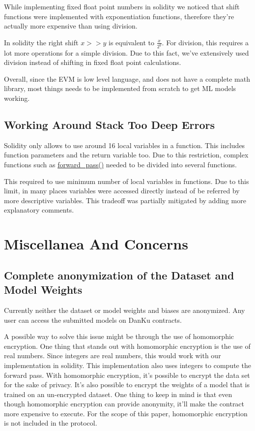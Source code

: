 \documentclass{article}
\begin{document}
While implementing fixed float point numbers in solidity we noticed that shift functions were implemented with exponentiation functions, therefore they’re actually more expensive than using division.

In solidity the right shift $x>>y$ is equivalent to $\frac{x}{2^y}$. For division, this requires a lot more operations for a simple division. Due to this fact, we’ve extensively used division instead of shifting in fixed float point calculations.

Overall, since the EVM is low level language, and does not have a complete math library, most things needs to be implemented from scratch to get ML models working.

\subsection{Working Around Stack Too Deep Errors}

Solidity only allows to use around 16 local variables in a function. This includes function parameters and the return variable too. Due to this restriction, complex functions such as \underline{forward\_pass()} needed to be divided into several functions.

This required to use minimum number of local variables in functions. Due to this limit, in many places variables were accessed directly instead of be referred by more descriptive variables. This tradeoff was partially mitigated by adding more explanatory comments.

\section{Miscellanea And Concerns}
\label{miscellanea_and_concerns}

\subsection{Complete anonymization of the Dataset and Model Weights}

Currently neither the dataset or model weights and biases are anonymized. Any user can access the submitted models on DanKu contracts.

A possible way to solve this issue might be through the use of homomorphic encryption. \cite{ML_encrypted_data_paper} One thing that stands out with homomorphic encryption is the use of real numbers. Since integers are real numbers, this would work with our implementation in solidity. This implementation also uses integers to compute the forward pass.
With homomorphic encryption, it’s possible to encrypt the data set for the sake of privacy. \cite{homomorphic_encryption_paper} It’s also possible to encrypt the weights of a model that is trained on an un-encrypted dataset. \cite{safe_ai_article} One thing to keep in mind is that even though homomorphic encryption can provide anonymity, it’ll make the contract more expensive to execute. For the scope of this paper, homomorphic encryption is not included in the protocol.
\end{document}
